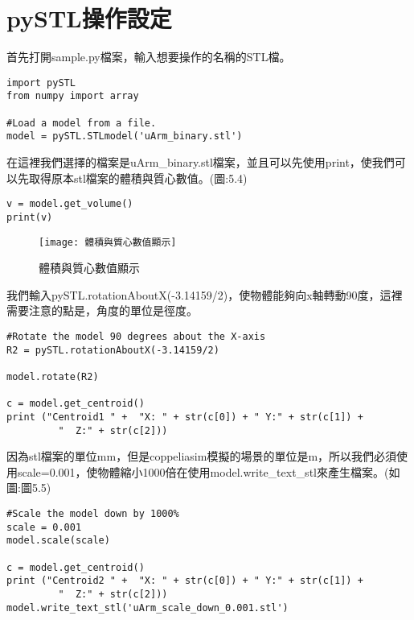\section{ pySTL操作設定}
首先打開sample.py檔案，輸入想要操作的名稱的STL檔。\\

 \begin{lstlisting}[caption=\Large 輸入名稱]
import pySTL
from numpy import array

#Load a model from a file.
model = pySTL.STLmodel('uArm_binary.stl')

\end{lstlisting}

在這裡我們選擇的檔案是uArm\_binary.stl檔案，並且可以先使用print，使我們可以先取得原本stl檔案的體積與質心數值。(圖:5.4) \\

 \begin{lstlisting}[caption=\Large 數值]
v = model.get_volume()
print(v)

\end{lstlisting}


\begin{figure}[hbt!]
\begin{center}
\texttt{[image:  體積與質心數值顯示]}
\caption{\Large 體積與質心數值顯示}\label{ 體積與質心數值顯示}
\end{center}
\end{figure}

我們輸入pySTL.rotationAboutX(-3.14159/2)，使物體能夠向x軸轉動90度，這裡需要注意的點是，角度的單位是徑度。\\

 \begin{lstlisting}[caption=\Large 向X軸轉90度]
#Rotate the model 90 degrees about the X-axis
R2 = pySTL.rotationAboutX(-3.14159/2)

model.rotate(R2)

c = model.get_centroid()
print ("Centroid1 " +  "X: " + str(c[0]) + " Y:" + str(c[1]) + 
         "  Z:" + str(c[2]))

\end{lstlisting}

因為stl檔案的單位mm，但是coppeliasim模擬的場景的單位是m，所以我們必須使用scale=0.001，使物體縮小1000倍在使用model.write\_text\_stl來產生檔案。(如圖:圖5.5)\\

 \begin{lstlisting}[caption=\Large 縮小1000倍]
#Scale the model down by 1000%
scale = 0.001
model.scale(scale)

c = model.get_centroid()
print ("Centroid2 " +  "X: " + str(c[0]) + " Y:" + str(c[1]) +
         "  Z:" + str(c[2]))
model.write_text_stl('uArm_scale_down_0.001.stl')

\end{lstlisting}

